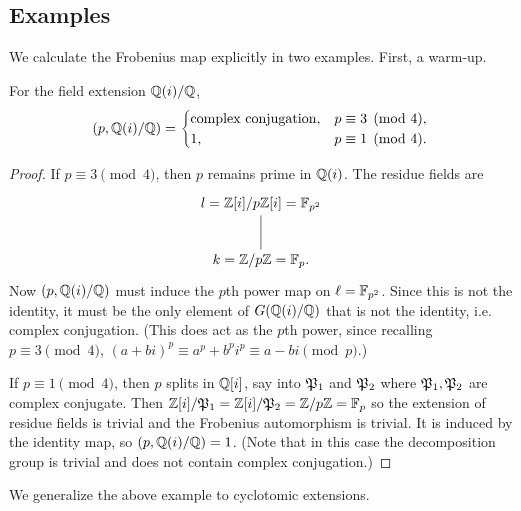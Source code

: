 \subsection{Examples}
We calculate the Frobenius map explicitly in two examples. First, a warm-up.
\begin{ex}
For the field extension $\mathbb{Q}(i)/\mathbb{Q}$,
\[
(p,\mathbb{Q}(i)/\mathbb{Q})=\begin{cases}
\text{complex conjugation},&p\equiv 3\pmod 4,\\
1, & p\equiv 1\pmod 4.
\end{cases}
\]
\end{ex}
\begin{proof}
If $p\equiv 3\pmod 4$, then $p$ remains prime in $\mathbb{Q}(i)$. 
The residue fields are 
\[
\xymatrix{
l =\Z[i]/p\Z[i]=\F_{p^2}\ar@{-}[d]\\
k=\Z/p\Z=\F_p.}
\]
Now $(p,\mathbb{Q}(i)/\mathbb{Q})$ must induce the $p$th power map on $\ell=\mathbb{F}_{p^2}$. Since this is not the identity, it must be the only element of $G(\mathbb{Q}(i)/\mathbb{Q})$ that is not the identity, i.e. complex conjugation. (This does act as the $p$th power, since recalling $p\equiv 3\pmod 4$,  
$(a+bi)^p\equiv a^p+b^pi^p\equiv a-bi\pmod{p}$.)

If $p\equiv 1\pmod 4$, then $p$ splits in $\mathbb{Q}[i]$, say into $\mathfrak{P}_1$ and $\mathfrak{P}_2$ where $\mathfrak{P}_1,\mathfrak{P}_2$ are complex conjugate. Then $\mathbb{Z}[i]/\mathfrak{P}_1=\mathbb{Z}[i]/\mathfrak{P}_2=\mathbb{Z}/p\mathbb{Z}=\mathbb{F}_p$ so the extension of residue fields is trivial and the Frobenius automorphism is trivial. It is induced by the identity map, so $(p,\mathbb{Q}(i)/\mathbb{Q})=1$. (Note that in this case the decomposition group is trivial and does not contain complex conjugation.)
\end{proof}
We generalize the above example to cyclotomic extensions.

